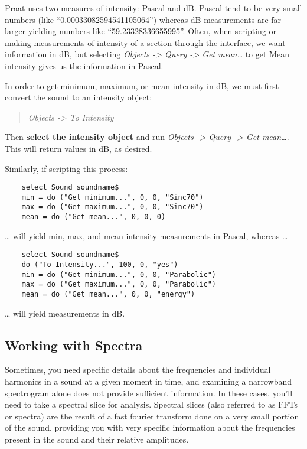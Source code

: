 \label{unitsofintensity}

Praat uses two measures of intensity: Pascal and dB. Pascal tend to be
very small numbers (like ``0.00033082594541105064'') whereas dB
measurements are far larger yielding numbers like ``59.23328336655995''.
Often, when scripting or making measurements of intensity of a section
through the interface, we want information in dB, but selecting
\emph{Objects -\textgreater{} Query -\textgreater{} Get mean\ldots{}} to
get Mean intensity gives us the information in Pascal.

In order to get minimum, maximum, or mean intensity in dB, we must first
convert the sound to an intensity object:

\begin{quote}
\emph{Objects -\textgreater{} To Intensity}
\end{quote}

Then \textbf{select the intensity object} and run \emph{Objects
-\textgreater{} Query -\textgreater{} Get mean\ldots{}}. This will
return values in dB, as desired.

Similarly, if scripting this process:

\begin{verbatim}
    select Sound soundname$
    min = do ("Get minimum...", 0, 0, "Sinc70")
    max = do ("Get maximum...", 0, 0, "Sinc70")
    mean = do ("Get mean...", 0, 0, 0)
\end{verbatim}

\ldots{} will yield min, max, and mean intensity measurements in Pascal,
whereas \ldots{}

\begin{verbatim}
    select Sound soundname$
    do ("To Intensity...", 100, 0, "yes")
    min = do ("Get minimum...", 0, 0, "Parabolic")
    max = do ("Get maximum...", 0, 0, "Parabolic")
    mean = do ("Get mean...", 0, 0, "energy")
\end{verbatim}

\ldots{} will yield measurements in dB.

\hypertarget{working-with-spectra}{%
\subsection{Working with Spectra}\label{working-with-spectra}}

Sometimes, you need specific details about the frequencies and
individual harmonics in a sound at a given moment in time, and examining
a narrowband spectrogram alone does not provide sufficient information.
In these cases, you'll need to take a spectral slice for analysis.
Spectral slices (also referred to as FFTs or spectra) are the result of
a fast fourier transform done on a very small portion of the sound,
providing you with very specific information about the frequencies
present in the sound and their relative amplitudes.


